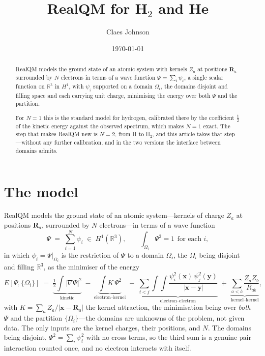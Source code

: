 \documentclass[11pt,a4paper]{article}
\title{RealQM for H$_2$ and He}
\author{Claes Johnson}
\date{\today}
\begin{document}
\maketitle

\begin{abstract}
RealQM models the ground state of an atomic system with kernels $Z_a$ at positions $\mathbf R_a$
surrounded by $N$ electrons in terms of a wave function $\Psi = \sum_i \psi_i$, a single scalar
function on $\mathbb R^3$ in $H^1$, with $\psi_i$ supported on a domain $\Omega_i$, the domains
disjoint and filling space and each carrying unit charge, minimising the energy over both $\Psi$ and
the partition.

For $N = 1$ this is the standard model for hydrogen, calibrated there by the coefficient $\tfrac12$
of the kinetic energy against the observed spectrum, which makes $N = 1$ exact. The step that makes
RealQM new is $N = 2$, from H to H$_2$, and this article takes that step---without any further
calibration, and in the two versions the interface between domains admits.
\end{abstract}

\section{The model}

RealQM models the ground state of an atomic system---kernels of charge $Z_a$ at positions
$\mathbf R_a$, surrounded by $N$ electrons---in terms of a wave function
\begin{equation}
  \Psi \;=\; \sum_{i=1}^{N} \psi_i \;\in\; H^1(\mathbb R^3) ,
  \qquad \int_{\Omega_i} \Psi^2 = 1 \ \ \text{for each } i ,
  \label{eq:psi}
\end{equation}
in which $\psi_i = \Psi|_{\Omega_i}$ is the restriction of $\Psi$ to a domain $\Omega_i$, the
$\Omega_i$ being disjoint and filling $\mathbb R^3$, as the minimiser of the energy
\begin{equation}
  E[\Psi, \{\Omega_i\}] \;=\;
    \underbrace{\tfrac12 \!\int |\nabla \Psi|^2}_{\text{kinetic}}
    \;-\; \underbrace{\int K\,\Psi^2}_{\text{electron--kernel}}
    \;+\; \underbrace{\sum_{i<j} \int\!\!\int
          \frac{\psi_i^2(\mathbf x)\,\psi_j^2(\mathbf y)}{|\mathbf x - \mathbf y|}}
          _{\text{electron--electron}}
    \;+\; \underbrace{\sum_{a<b} \frac{Z_a Z_b}{R_{ab}}}_{\text{kernel--kernel}} ,
  \label{eq:E}
\end{equation}
with $K = \sum_a Z_a/|\mathbf x - \mathbf R_a|$ the kernel attraction, the minimisation being over
\emph{both} $\Psi$ and the partition $\{\Omega_i\}$---the domains are unknowns of the problem, not
given data. The only inputs are the kernel charges, their positions, and $N$. The domains being disjoint, $\Psi^2 = \sum_i \psi_i^2$ with no cross
terms, so the third sum is a genuine pair interaction counted once, and no electron interacts with
itself.
\end{document}
